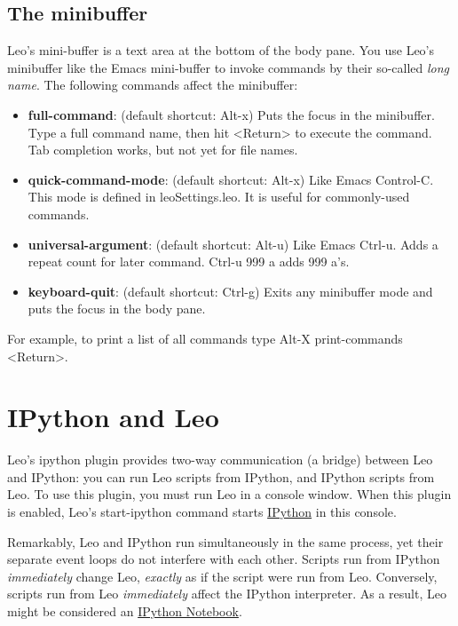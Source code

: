 \documentclass[a4paper,10pt,english]{sphinxmanual}
\begin{document}
\section{The minibuffer}
\label{emacs:the-minibuffer}
Leo's mini-buffer is a text area at the bottom of the body pane.
You use Leo's minibuffer like the Emacs mini-buffer to invoke commands by their so-called \emph{long name}.
The following commands affect the minibuffer:
\begin{itemize}
\item {} 
\textbf{full-command}: (default shortcut: Alt-x) Puts the focus in the minibuffer. Type a
full command name, then hit \textless{}Return\textgreater{} to execute the command. Tab completion
works, but not yet for file names.

\item {} 
\textbf{quick-command-mode}: (default shortcut: Alt-x) Like Emacs Control-C. This mode is
defined in leoSettings.leo. It is useful for commonly-used commands.

\item {} 
\textbf{universal-argument}: (default shortcut: Alt-u) Like Emacs Ctrl-u. Adds a repeat
count for later command. Ctrl-u 999 a adds 999 a's.

\item {} 
\textbf{keyboard-quit}: (default shortcut: Ctrl-g) Exits any minibuffer mode and puts
the focus in the body pane.

\end{itemize}

For example, to print a list of all commands type Alt-X print-commands \textless{}Return\textgreater{}.


\chapter{IPython and Leo}
\label{IPythonBridge:ipython-and-leo}\label{IPythonBridge::doc}
Leo's ipython plugin provides two-way communication (a bridge) between Leo and
IPython: you can run Leo scripts from IPython, and IPython scripts from Leo. To
use this plugin, you must run Leo in a console window. When this plugin is
enabled, Leo's start-ipython command starts \href{http://ipython.scipy.org/}{IPython} in this console.

Remarkably, Leo and IPython run simultaneously in the same process,
yet their separate event loops do not interfere with each other.
Scripts run from IPython \emph{immediately} change Leo,
\emph{exactly} as if the script were run from Leo.
Conversely, scripts run from Leo \emph{immediately} affect the IPython interpreter.
As a result, Leo might be considered an \href{http://projects.scipy.org/ipython/ipython/wiki/NoteBook}{IPython Notebook}.
\end{document}

